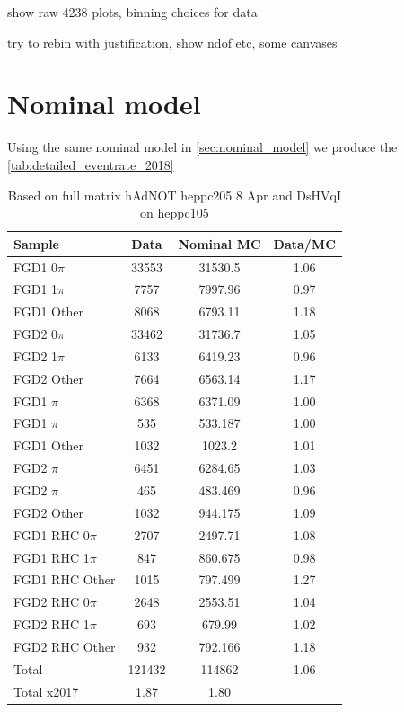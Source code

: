 show raw 4238 plots, binning choices for data

try to rebin with justification, show ndof etc, some canvases


\section{Nominal model}
Using the same nominal model in \autoref{sec:nominal_model} we produce the \autoref{tab:detailed_eventrate_2018}
\begin{table}[h]
	\centering
	\begin{tabular}{ l c c c }
		\hline
        \hline
		Sample & Data & Nominal MC & Data/MC \\
		\hline
		FGD1 0$\pi$       & 33553 & 31530.5  & 1.06 \\
		FGD1 1$\pi$       & 7757  & 7997.96  & 0.97 \\
		FGD1 Other        & 8068  & 6793.11  & 1.18 \\
		\hline
		FGD2 0$\pi$       & 33462 & 31736.7 & 1.05\\
		FGD2 1$\pi$       & 6133  & 6419.23 & 0.96 \\
		FGD2 Other        & 7664  & 6563.14 & 1.17 \\
		\hline
		FGD1 \numubar 0$\pi$       & 6368 & 6371.09  & 1.00 \\
		FGD1 \numubar 1$\pi$       & 535  & 533.187  & 1.00 \\
		FGD1 \numubar Other        & 1032 & 1023.2  & 1.01 \\
		\hline
		FGD2 \numubar 0$\pi$       & 6451 & 6284.65  & 1.03  \\
		FGD2 \numubar 1$\pi$       & 465  & 483.469  & 0.96 \\
		FGD2 \numubar Other        & 1032 & 944.175 & 1.09 \\
		\hline
		FGD1 \numu RHC 0$\pi$       & 2707 & 2497.71 & 1.08 \\
		FGD1 \numu RHC 1$\pi$       & 847  & 860.675 & 0.98 \\
		FGD1 \numu RHC Other        & 1015 & 797.499 & 1.27 \\
		\hline
		FGD2 \numu RHC 0$\pi$       & 2648 & 2553.51 & 1.04 \\
		FGD2 \numu RHC 1$\pi$       & 693  & 679.99  & 1.02 \\
		FGD2 \numu RHC Other        & 932  & 792.166 & 1.18 \\
                \hline
		Total & 121432 & 114862 & 1.06 \\
		Total x2017 & 1.87 & 1.80 & \\
		\hline
		\hline
	\end{tabular}
        \caption{Based on full matrix hAdNOT heppc205 8 Apr and DsHVqI on heppc105}
	\label{tab:detailed_eventrate_2018}
\end{table}

